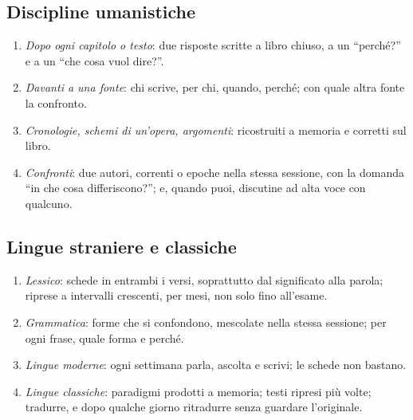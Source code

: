 \subsection*{Discipline umanistiche}

\begin{enumerate}[leftmargin=1.4em, itemsep=0pt, topsep=0.2\baselineskip]
  \item \emph{Dopo ogni capitolo o testo}: due risposte scritte a libro
        chiuso, a un \enquote{perché?} e a un \enquote{che cosa vuol
        dire?}.
  \item \emph{Davanti a una fonte}: chi scrive, per chi, quando, perché;
        con quale altra fonte la confronto.
  \item \emph{Cronologie, schemi di un'opera, argomenti}: ricostruiti a
        memoria e corretti sul libro.
  \item \emph{Confronti}: due autori, correnti o epoche nella stessa
        sessione, con la domanda \enquote{in che cosa differiscono?};
        e, quando puoi, discutine ad alta voce con qualcuno.
\end{enumerate}

\subsection*{Lingue straniere e classiche}

\begin{enumerate}[leftmargin=1.4em, itemsep=0pt, topsep=0.2\baselineskip]
  \item \emph{Lessico}: schede in entrambi i versi, soprattutto dal
        significato alla parola; riprese a intervalli crescenti, per
        mesi, non solo fino all'esame.
  \item \emph{Grammatica}: forme che si confondono, mescolate nella
        stessa sessione; per ogni frase, quale forma e perché.
  \item \emph{Lingue moderne}: ogni settimana parla, ascolta e scrivi;
        le schede non bastano.
  \item \emph{Lingue classiche}: paradigmi prodotti a memoria; testi
        ripresi più volte; tradurre, e dopo qualche giorno ritradurre
        senza guardare l'originale.
\end{enumerate}


